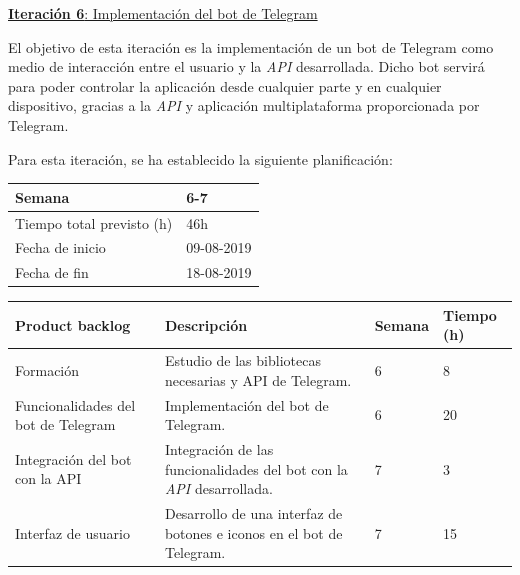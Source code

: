 \newpage


\large{\underline{\textbf{Iteración 6}: Implementación del bot de Telegram}}
\vspace{0.3cm}

\normalsize

El objetivo de esta iteración es la implementación de un bot de Telegram como medio de interacción entre el usuario y la \textit{API} desarrollada. Dicho bot servirá para poder controlar la aplicación desde cualquier parte y en cualquier dispositivo, gracias a la \textit{API} y aplicación multiplataforma proporcionada por Telegram.

Para esta iteración, se ha establecido la siguiente planificación:

\begin{table}[h!]
\centering
\begin{tabular}{|p{5cm}|p{4cm}|}
 \hline
	\cellcolor[gray]{0.9} Semana  & 6-7\\ \hline
	\cellcolor[gray]{0.9} Tiempo total previsto (h)  & 46h \\ \hline
	\cellcolor[gray]{0.9} Fecha de inicio  & 09-08-2019 \\ \hline
	\cellcolor[gray]{0.9} Fecha de fin  & 18-08-2019 \\ \hline
		
\end{tabular}
\end{table}

\begin{table}[h!]
\begin{tabular}{|p{4cm}|p{7.2cm}|p{1.3cm}|p{2.1cm}|}
\hline
\rowcolor[HTML]{9B9B9B} 
{\color[HTML]{FFFFFF} Product backlog} & {\color[HTML]{FFFFFF} Descripción}                                  & {\color[HTML]{FFFFFF} Semana} & {\color[HTML]{FFFFFF}Tiempo (h)} \\ \hline

Formación                          & Estudio de las bibliotecas necesarias y API de Telegram.
                                        & 6                            & 8                                   \\ \hline
          
Funcionalidades del bot de Telegram                         &  Implementación del bot de Telegram.
          & 6                             & 20                                   \\ \hline

Integración del bot con la API & Integración de las funcionalidades del bot con la \textit{API} desarrollada.

          & 7                             & 3                                   \\ \hline

Interfaz de usuario                        & Desarrollo de una interfaz de botones e iconos en el bot de Telegram.
          & 7                             & 15                                  \\ \hline

\end{tabular}
\end{table}

